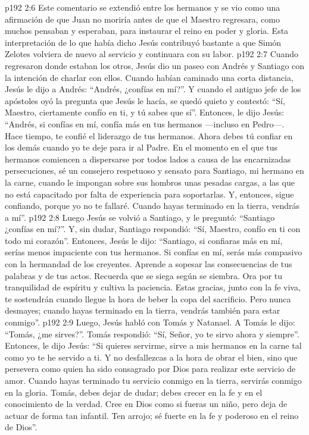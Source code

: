 \vs p192 2:6 \pc Este comentario se extendió entre los hermanos y se vio como una afirmación de que Juan no moriría antes de que el Maestro regresara, como muchos pensaban y esperaban, para instaurar el reino en poder y gloria. Esta interpretación de lo que había dicho Jesús contribuyó bastante a que Simón Zelotes volviera de nuevo al servicio y continuara con su labor.
\vs p192 2:7 \pc Cuando regresaron donde estaban los otros, Jesús dio un paseo con Andrés y Santiago con la intención de charlar con ellos. Cuando habían caminado una corta distancia, Jesús le dijo a Andrés: “Andrés, ¿confías en mí?”. Y cuando el antiguo jefe de los apóstoles oyó la pregunta que Jesús le hacía, se quedó quieto y contestó: “Sí, Maestro, ciertamente confío en ti, y tú sabes que sí”. Entonces, le dijo Jesús: “Andrés, si confías en mí, confía más en tus hermanos ---incluso en Pedro---. Hace tiempo, te confié el liderazgo de tus hermanos. Ahora debes tú confiar en los demás cuando yo te deje para ir al Padre. En el momento en el que tus hermanos comiencen a dispersarse por todos lados a causa de las encarnizadas persecuciones, sé un consejero respetuoso y sensato para Santiago, mi hermano en la carne, cuando le impongan sobre sus hombros unas pesadas cargas, a las que no está capacitado por falta de experiencia para soportarlas. Y, entonces, sigue confiando, porque yo no te fallaré. Cuando hayas terminado en la tierra, vendrás a mí”.
\vs p192 2:8 Luego Jesús se volvió a Santiago, y le preguntó: “Santiago ¿confías en mí?”. Y, sin dudar, Santiago respondió: “Sí, Maestro, confío en ti con todo mi corazón”. Entonces, Jesús le dijo: “Santiago, si confiaras más en mí, serías menos impaciente con tus hermanos. Si confías en mí, serás más compasivo con la hermandad de los creyentes. Aprende a sopesar las consecuencias de tus palabras y de tus actos. Recuerda que se siega según se siembra. Ora por tu tranquilidad de espíritu y cultiva la paciencia. Estas gracias, junto con la fe viva, te sostendrán cuando llegue la hora de beber la copa del sacrificio. Pero nunca desmayes; cuando hayas terminado en la tierra, vendrás también para estar conmigo”.
\vs p192 2:9 \pc Luego, Jesús habló con Tomás y Natanael. A Tomás le dijo: “Tomás, ¿me sirves?”. Tomás respondió: “Sí, Señor, yo te sirvo ahora y siempre”. Entonces, le dijo Jesús: “Si quieres servirme, sirve a mis hermanos en la carne tal como yo te he servido a ti. Y no desfallezcas a la hora de obrar el bien, sino que persevera como quien ha sido consagrado por Dios para realizar este servicio de amor. Cuando hayas terminado tu servicio conmigo en la tierra, servirás conmigo en la gloria. Tomás, debes dejar de dudar; debes crecer en la fe y en el conocimiento de la verdad. Cree en Dios como si fueras un niño, pero deja de actuar de forma tan infantil. Ten arrojo; sé fuerte en la fe y poderoso en el reino de Dios”.
